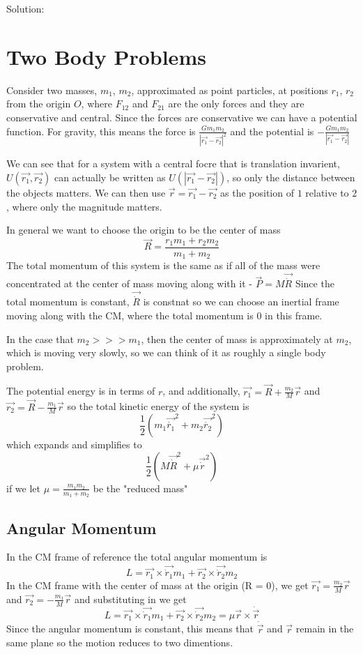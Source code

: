 \documentclass{homework}
\begin{document}
Solution: 




\section{Two Body Problems}

Consider two masses, $m_1$, $m_2$, approximated as point particles, at positions $r_1$, $r_2$ from the origin $O$, where $F_{12}$ and $F_{21}$ are the only forces and they are conservative and central.
Since the forces are conservative we can have a potential function. For gravity, this means the force is $\frac{Gm_1m_2}{|\vec{r_1} - \vec{r_2}|^2}$ and the potential is  $-\frac{Gm_1m_2}{|\vec{r_1} - \vec{r_2}|}$

We can see that for a system with a central focre that is translation invarient, $U(\vec{r_1},\vec{r_2})$ can actually be written as $U(|\vec{r_1}-\vec{r_2}|)$, so only the distance between the objects matters. We can then use $\vec{r} = \vec{r_1} - \vec{r_2}$ as the position of $1$ relative to $2$, where only the magnitude matters.


In general we want to choose the origin to be the center of mass
\[\vec{R} = \frac{r_1m_1 + r_2m_2}{m_1 + m_2}\]
The total momentum of this system is the same as if all of the mass were concentrated at the center of mass moving along with it - $\vec{P} = M\vec{\dot R}$ Since the total momentum is constant, $\vec{\dot R}$ is constnat so we can choose an inertial frame moving along with the CM, where the total momentum is $0$ in this frame.

In the case that $m_2 >>> m_1$, then the center of mass is approximately at $m_2$, which is moving very slowly, so we can think of it as roughly a single body problem.

The potential energy is in terms of $r$, and additionally, $\vec{r_1} = \vec{R} +\frac{m_2}{M}\vec{r}$ and $\vec{r_2} = \vec{R} -\frac{m_1}{M}\vec{r}$ so the total kinetic energy of the system is 
\[\frac{1}{2}(m_1\vec{\dot{r_1}}^2 + m_2\vec{\dot{r_2}}^2)\]
which expands and simplifies to 
\[\frac{1}{2}(M\vec{\dot{R}}^2 + \mu \vec{\dot{r}}^2)\]
if we let $\mu = \frac{m_1m_2}{m_1 + m_2}$ be the "reduced mass"

\subsection{Angular Momentum}

In the CM frame of reference the total angular momentum is
\[L = \vec{r_1}\times\vec{\dot{r}_1}m_1 + \vec{r_2}\times\vec{\dot{r}_2}m_2\]
In the CM frame with the center of mass at the origin (R = 0), we get $\vec{r_1} =\frac{m_2}{M}\vec{r}$ and $\vec{r_2} = -\frac{m_1}{M}\vec{r}$ and substituting in we get
\[L = \vec{r_1}\times\vec{\dot{r}_1}m_1 + \vec{r_2}\times\vec{\dot{r}_2}m_2 = \mu  \vec{r} \times \dot{\vec{r}} \]
Since the angular momentum is constant, this means that $\dot{\vec{r}} $ and $ \vec{r}$ remain in the same plane so the motion reduces to two dimentions.
\end{document}
